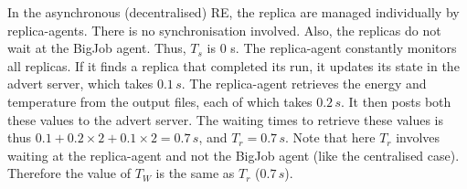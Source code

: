 \documentclass{rspublic}
\newcommand{\alnote}[1]{ {\textcolor{blue} { ***andre: #1 }}}
\newcommand{\athotanote}[1]{ {\textcolor{green} { ***athota: #1 }}}
\newcommand{\alnote}[1]{}
\newcommand{\athotanote}[1]{}
\begin{document}
In the asynchronous (decentralised) RE, the replica are managed
individually by replica-agents. There is no synchronisation
involved. Also, the replicas do not wait at the BigJob agent. Thus,
$T_s$ is 0 s.  The replica-agent constantly monitors all replicas. If
it finds a replica that completed its run, it updates its state in the
advert server, which takes $0.1\,s$.  The replica-agent retrieves the
energy and temperature from the output files, each of which takes
$0.2\,s$. It then posts both these values to the advert server.  The
waiting times to retrieve these values is thus
$0.1+0.2\times2+0.1\times2=0.7\,s$, and $T_r = 0.7\,s$.  Note that
here $T_r$ involves waiting at the replica-agent and not the BigJob
agent (like the centralised case). Therefore the value of $T_W$ is the
same as $T_r$ ($0.7\,s$).




\end{document}
